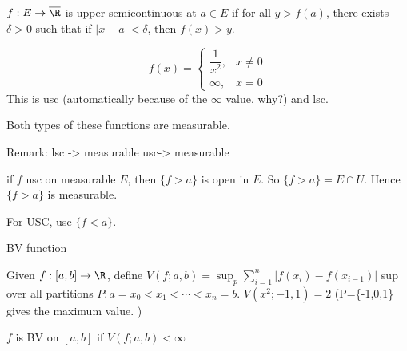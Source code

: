 


\begin{dfn}
$f: E \to \overline{\R}$ is upper semicontinuous at $a \in E$ if for all $y>f(a)$, there exists $\delta>0$ such that if $|x-a|<\delta$, then $f(x)>y$. 
\end{dfn}

\begin{ex}
	\[
	f(x)=
	\begin{cases}
	\dfrac{1}{x^2}, & x \neq 0 \\
	\infty, & x=0
	\end{cases}
	\]
This is usc (automatically because of the $\infty$ value, why?) and lsc. 
\end{ex}

Both types of these functions are measurable. 



Remark: lsc -> measurable
usc-> measurable

\pf if $f$ usc on measurable $E$, then $\{f>a\}$ is open in $E$. So $\{f>a\}=E \cap U$. Hence $\{f>a\}$ is measurable.

For USC, use $\{f<a\}$.







BV function

Given $f: [a,b] \to \R$, define $V(f; a,b)=\sup_p \sum_{i=1}^n |f(x_i)-f(x_{i-1})|$ sup over all partitions $P:a=x_0<x_1<\cdots<x_n=b$. $V(x^2; -1,1)=2$ (P=\{-1,0,1\} gives the maximum value. ) 


\begin{dfn}
$f$ is BV on $[a,b]$ if $V(f; a,b)<\infty$
\end{dfn}

